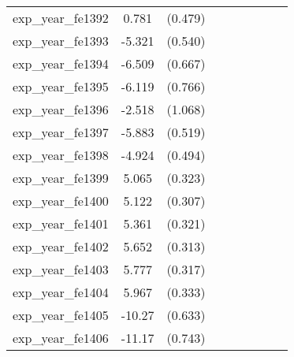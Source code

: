 {\begin{tabular}{l*{4}{cc}}
exp\_year\_fe1392&    0.781         &  (0.479)&                  &         &                  &         &                  &         \\
exp\_year\_fe1393&   -5.321\sym{***}&  (0.540)&                  &         &                  &         &                  &         \\
exp\_year\_fe1394&   -6.509\sym{***}&  (0.667)&                  &         &                  &         &                  &         \\
exp\_year\_fe1395&   -6.119\sym{***}&  (0.766)&                  &         &                  &         &                  &         \\
exp\_year\_fe1396&   -2.518\sym{*}  &  (1.068)&                  &         &                  &         &                  &         \\
exp\_year\_fe1397&   -5.883\sym{***}&  (0.519)&                  &         &                  &         &                  &         \\
exp\_year\_fe1398&   -4.924\sym{***}&  (0.494)&                  &         &                  &         &                  &         \\
exp\_year\_fe1399&    5.065\sym{***}&  (0.323)&                  &         &                  &         &                  &         \\
exp\_year\_fe1400&    5.122\sym{***}&  (0.307)&                  &         &                  &         &                  &         \\
exp\_year\_fe1401&    5.361\sym{***}&  (0.321)&                  &         &                  &         &                  &         \\
exp\_year\_fe1402&    5.652\sym{***}&  (0.313)&                  &         &                  &         &                  &         \\
exp\_year\_fe1403&    5.777\sym{***}&  (0.317)&                  &         &                  &         &                  &         \\
exp\_year\_fe1404&    5.967\sym{***}&  (0.333)&                  &         &                  &         &                  &         \\
exp\_year\_fe1405&   -10.27\sym{***}&  (0.633)&                  &         &                  &         &                  &         \\
exp\_year\_fe1406&   -11.17\sym{***}&  (0.743)&                  &         &                  &         &                  &         \\

\end{tabular}}

